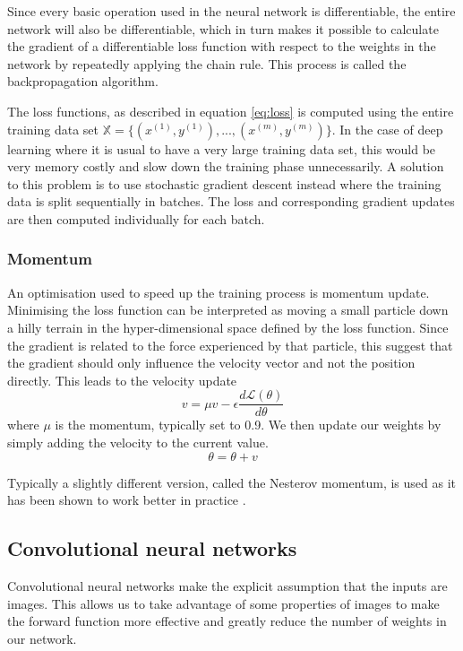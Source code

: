 \documentclass[12pt,a4paper,twoside,openright]{report}
\begin{document}
Since every basic operation used in the neural network is differentiable, the entire network will also be differentiable, which in turn makes it possible to calculate the gradient of a differentiable loss function with respect to the weights in the network by repeatedly applying the chain rule. This process is called the backpropagation algorithm.

The loss functions, as described in equation \ref{eq:loss} is computed using the entire training data set $\mathbb{X} = \{(x^{(1)},y^{(1)}), ...,(x^{(m)},y^{(m)})\}$. In the case of deep learning where it is usual to have a very large training data set, this would be very memory costly and slow down the training phase unnecessarily. A solution to this problem is to use stochastic gradient descent instead where the training data is split sequentially in batches. The loss and corresponding gradient updates are then computed individually for each batch.

\subsubsection{Momentum}
An optimisation used to speed up the training process is momentum update. Minimising the loss function can be interpreted as moving a small particle down a hilly terrain in the hyper-dimensional space defined by the loss function. Since the gradient is related to the force experienced by that particle, this suggest that the gradient should only influence the velocity vector and not the position directly. This leads to the velocity update
\begin{equation}
	v = \mu  v - \epsilon \frac{d\mathcal{L}(\theta)}{d\theta}
\end{equation}
where $\mu$ is the momentum, typically set to 0.9. We then update our weights by simply adding the velocity to the current value.
\begin{equation}
	\theta = \theta + v
\end{equation}

Typically a slightly different version, called the Nesterov momentum, is used as it has been shown to work better in practice \cite{nesterov_momentum}.

\subsection{Convolutional neural networks}
Convolutional neural networks make the explicit assumption that the inputs are images. This allows us to take advantage of some properties of images to make the forward function more effective and greatly reduce the number of weights in our network. 
\end{document}
